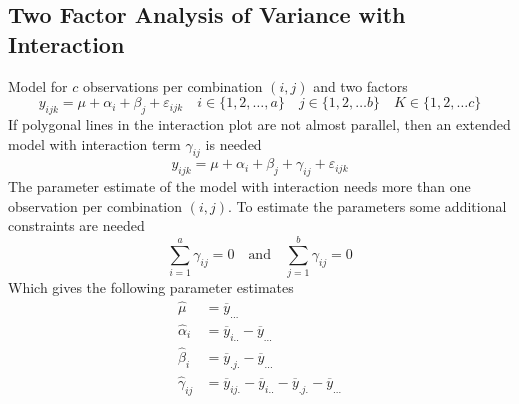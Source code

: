 \documentclass[11pt]{article}
\theoremstyle{definition}
\newcommand*\samplemean[1]{\overline{#1}}
\begin{document}
\subsection{Two Factor Analysis of Variance with Interaction}
Model for $c$ observations per combination $(i,j)$ and two factors
\begin{equation*}
	y_{ijk} = \mu + \alpha_i + \beta_j + \varepsilon_{ijk}\quad i\in\{1,2,\dots,a\}\quad j\in\{1,2,\dots b\}\quad K\in\{1,2,\dots c\}
\end{equation*}
If polygonal lines in the interaction plot are not almost parallel, then an extended model with interaction term $\gamma_{ij}$ is needed
\begin{equation*}
	y_{ijk} = \mu + \alpha_i + \beta_j + \gamma_{ij} + \varepsilon_{ijk}
\end{equation*}
The parameter estimate of the model with interaction needs more than one observation per combination $(i,j)$. To estimate the parameters some additional constraints are needed
\begin{equation*}
	\sum_{i=1}^{a}\gamma_{ij} = 0\quad\text{and}\quad\sum_{j=1}^{b}\gamma_{ij} = 0
\end{equation*}
Which gives the following parameter estimates
\begin{align*}
	\hat{\mu} &= \samplemean{y}_{...}\\
	\hat{\alpha}_i &= \samplemean{y}_{i..} - \samplemean{y}_{...}\\
	\hat{\beta}_i &= \samplemean{y}_{.j.} - \samplemean{y}_{...}\\
	\hat{\gamma}_{ij} &= \samplemean{y}_{ij.} - \samplemean{y}_{i..} - \samplemean{y}_{.j.} - \samplemean{y}_{...}
\end{align*}
\end{document}
